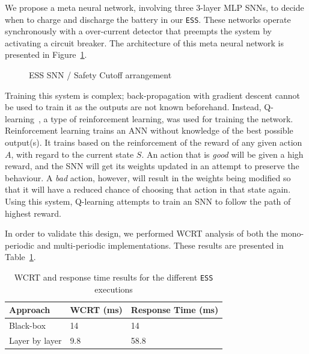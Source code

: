 We propose a meta neural network, involving three 3-layer \ac{MLP} \acp{SNN}, to decide when to charge and discharge the battery in our \texttt{ESS}.
These networks operate synchronously with a over-current detector
that preempts the system by activating a circuit breaker.
The architecture of this meta neural network is presented in Figure~\ref{fig:ess-sanns}. 

\begin{figure}[h]
	\centering
	\scalebox{0.8}{}
	\caption{ESS \ac{SNN} / Safety Cutoff arrangement}
	\label{fig:ess-sanns}
\end{figure}

Training this system is complex; back-propagation with gradient descent cannot be used to train it as the outputs are not known beforehand.
Instead, Q-learning~\cite{qlearning2010}, a type of reinforcement learning, was used for training the network.
Reinforcement learning trains an \ac{ANN} without knowledge of the best possible output(s). 
It trains based on the reinforcement of the reward of any given action $A$, with regard to the current state $S$. 
An action that is \emph{good} will be given a high reward, and the \ac{SNN} will get its weights updated in an attempt to preserve the behaviour.
A \emph{bad} action, however, will result in the  weights being modified so that it will have a reduced chance of choosing that action in that state again. 
Using this system, Q-learning attempts to train an \ac{SNN} to follow the path of highest reward.


In order to validate this design, we performed \ac{WCRT} analysis of
both the mono-periodic and multi-periodic implementations. 
These results are presented in Table~\ref{tbl:res-ess}.

\begin{table}[h]
	\centering
	\caption{\ac{WCRT} and response time results for the different \texttt{ESS} executions}
	\label{tbl:res-ess}
	\begin{tabular}{|l|l|l|}
		\hline
		Approach         & WCRT (ms) & Response Time (ms)\\ \hline
		Black-box        & 14   & 14 \\ 
		Layer by layer   & 9.8  & 58.8 \\ \hline
	\end{tabular}
\end{table}


